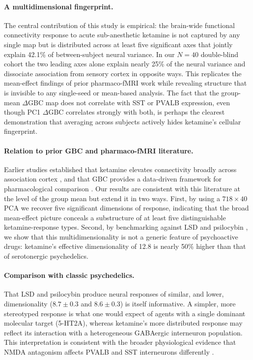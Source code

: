 \documentclass[11pt]{article}
\begin{document}
\paragraph{A multidimensional fingerprint.} The central contribution of
this study is empirical: the brain-wide functional connectivity response
to acute sub-anesthetic ketamine is not captured by any single map but is
distributed across at least five significant axes that jointly explain
42.1\% of between-subject neural variance. In our $N=40$ double-blind
cohort the two leading axes alone explain nearly 25\% of the neural
variance and dissociate association from sensory cortex in opposite ways.
This replicates the mean-effect findings of prior pharmaco-fMRI work
\citep{driesen2013relationship,anticevic2014ncs,abdallah2018ketamine} while
revealing structure that is invisible to any single-seed or mean-based
analysis. The fact that the group-mean $\Delta$GBC map does not correlate
with SST or PVALB expression, even though PC1 $\Delta$GBC correlates
strongly with both, is perhaps the clearest demonstration that averaging
across subjects actively hides ketamine's cellular fingerprint.

\paragraph{Relation to prior GBC and pharmaco-fMRI literature.} Earlier
studies established that ketamine elevates connectivity broadly across
association cortex \citep{driesen2013relationship,anticevic2014ncs}, and
that GBC provides a data-driven framework for pharmacological comparison
\citep{cole2010globalbrain,abdallah2018ketamine}. Our results are consistent
with this literature at the level of the group mean but extend it in two
ways. First, by using a $718 \times 40$ PCA we recover five significant
dimensions of response, indicating that the broad mean-effect picture
conceals a substructure of at least five distinguishable ketamine-response
types. Second, by benchmarking against LSD and psilocybin
\citep{carhart2016neural,preller2020psilocybin,preller2018effective}, we
show that this multidimensionality is not a generic feature of psychoactive
drugs: ketamine's effective dimensionality of 12.8 is nearly 50\% higher
than that of serotonergic psychedelics.

\paragraph{Comparison with classic psychedelics.} That LSD and psilocybin
produce neural responses of similar, and lower, dimensionality
($8.7\pm0.3$ and $8.6\pm0.3$) is itself informative. A simpler, more
stereotyped response is what one would expect of agents with a single
dominant molecular target (5-HT2A), whereas ketamine's more distributed
response may reflect its interaction with a heterogeneous GABAergic
interneuron population. This interpretation is consistent with the broader
physiological evidence that NMDA antagonism affects PVALB and SST
interneurons differently
\citep{homayoun2007nmda,rudy2011three,tremblay2016gabaergic}.
\end{document}
